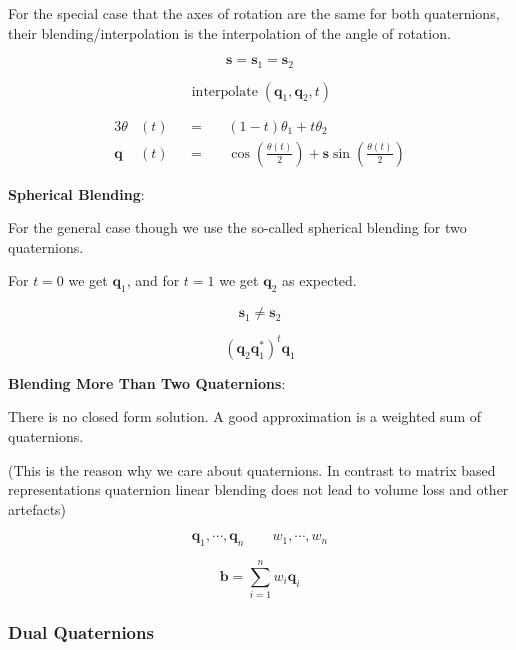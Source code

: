 \documentclass{article}
\begin{document}
For the special case that the axes of rotation are the same for both quaternions, their blending/interpolation
is the interpolation of the angle of rotation.

\[
    \mathbf{s} = \mathbf{s}_1 = \mathbf{s}_2
\]

\[
    \operatorname{interpolate}(\mathbf{q}_1, \mathbf{q}_2, t)
\]

\vspace{-15px}

\begin{alignat*}{3}
    \theta&(t) &&= \ &&(1-t)\theta_1 + t \theta_2 \\
    \mathbf{q}&(t) &&= &&\cos \left(\frac{\theta(t)}{2}\right) + \mathbf{s} \sin\left(\frac{\theta(t)}{2}\right)
\end{alignat*}

\textbf{Spherical Blending}:

\vspace{5px}

For the general case though we use the so-called spherical blending for two quaternions.

\vspace{5px}

For \(t=0\) we get \(\mathbf{q}_1\), and for \(t=1\) we get \(\mathbf{q}_2\) as expected.

\[
    \mathbf{s}_1 \neq \mathbf{s}_2
\]

\[
    (\mathbf{q}_2 \mathbf{q}_1^*)^t \mathbf{q}_1
\]


\textbf{Blending More Than Two Quaternions}:

There is no closed form solution. A good approximation is a weighted sum of quaternions.

(This is the reason why we care about quaternions. In contrast to matrix based representations 
quaternion linear blending does not lead to volume loss and other artefacts)

\[
    \mathbf{q}_{1}, \cdots, \mathbf{q}_{n} \qquad w_{1}, \cdots, w_{n}
\]

\[
    \mathbf{b} = \sum_{i=1}^{n}w_i \mathbf{q}_i
\]

\newpage

\subsubsection{Dual Quaternions}
\end{document}
